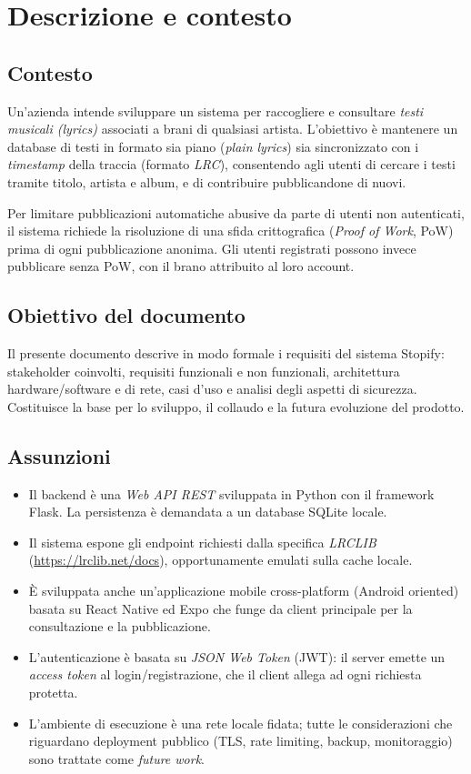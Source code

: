 \section{Descrizione e contesto}

\subsection{Contesto}
Un'azienda intende sviluppare un sistema per raccogliere e consultare \emph{testi
musicali (lyrics)} associati a brani di qualsiasi artista. L'obiettivo è mantenere
un database di testi in formato sia piano (\emph{plain lyrics}) sia sincronizzato
con i \emph{timestamp} della traccia (formato \emph{LRC}), consentendo agli utenti
di cercare i testi tramite titolo, artista e album, e di contribuire
pubblicandone di nuovi.

Per limitare pubblicazioni automatiche abusive da parte di utenti non
autenticati, il sistema richiede la risoluzione di una sfida crittografica
(\emph{Proof of Work}, PoW) prima di ogni pubblicazione anonima. Gli utenti
registrati possono invece pubblicare senza PoW, con il brano attribuito al
loro account.

\subsection{Obiettivo del documento}
Il presente documento descrive in modo formale i requisiti del sistema Stopify:
stakeholder coinvolti, requisiti funzionali e non funzionali, architettura
hardware/software e di rete, casi d'uso e analisi degli aspetti di sicurezza.
Costituisce la base per lo sviluppo, il collaudo e la futura evoluzione del
prodotto.

\subsection{Assunzioni}
\begin{itemize}
    \item Il backend è una \emph{Web API REST} sviluppata in Python con il
    framework Flask. La persistenza è demandata a un database SQLite locale.
    \item Il sistema espone gli endpoint richiesti dalla specifica
    \emph{LRCLIB} (\url{https://lrclib.net/docs}), opportunamente emulati
    sulla cache locale.
    \item È sviluppata anche un'applicazione mobile cross-platform (Android oriented) basata su React Native ed Expo che funge da client
    principale per la consultazione e la pubblicazione.
    \item L'autenticazione è basata su \emph{JSON Web Token} (JWT):
    il server emette un \emph{access token} al login/registrazione,
    che il client allega ad ogni richiesta protetta.
    \item L'ambiente di esecuzione è una rete locale fidata; tutte le
    considerazioni che riguardano deployment pubblico (TLS, rate limiting,
    backup, monitoraggio) sono trattate come \emph{future work}.
\end{itemize}
